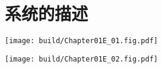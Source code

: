 \section{系统的描述}

\begin{Figure}[两个典型的系统]
    \begin{FigureSub}[电路系统]
        \texttt{[image: build/Chapter01E\_01.fig.pdf]}
    \end{FigureSub}
    \hspace{0.5cm}
    \begin{FigureSub}[力学系统]
        \texttt{[image: build/Chapter01E\_02.fig.pdf]}
    \end{FigureSub}
\end{Figure}